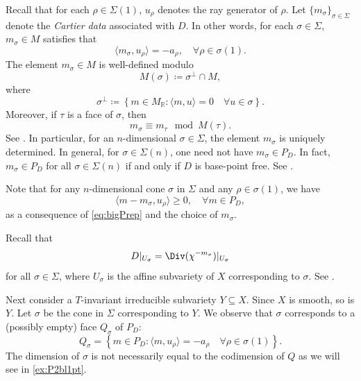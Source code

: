 Recall that for each $\rho\in \Sigma(1)$, $u_{\rho}$ denotes the ray generator of $\rho$.
Let $\{m_{\sigma}\}_{\sigma\in \Sigma}$ denote the \emph{Cartier data} associated with $D$. In other words, for each $\sigma\in \Sigma$, $m_{\sigma}\in M$ satisfies that
\[
\langle m_{\sigma},u_{\rho} \rangle =-a_{\rho},\quad \forall \rho\in \sigma(1).
\]
The element $m_{\sigma}\in M$ is well-defined modulo
\begin{equation}\label{eq:Msigmadef}
    M(\sigma)\coloneqq \sigma^{\perp}\cap M,
\end{equation}
where
\[
\sigma^{\perp}\coloneqq \left\{ m\in M_{\mathbb{R}} : \langle m,u\rangle=0 \quad\forall u\in \sigma \right\}.
\]
Moreover, if $\tau$ is a face of $\sigma$, then
\begin{equation}\label{eq:Cartierdatalowdim}
m_{\sigma}\equiv m_{\tau} \mod M(\tau).
\end{equation}
See \cite[Theorem~4.2.8]{CLS11}. In particular, for an $n$-dimensional $\sigma\in \Sigma$, the element $m_{\sigma}$ is uniquely determined. In general, for $\sigma\in \Sigma(n)$, one need not have $m_{\sigma}\in P_D$. In fact, $m_{\sigma}\in P_D$ for all $\sigma\in \Sigma(n)$ if and only if $D$ is base-point free. See \cite[Theorem~6.1.7]{CLS11}.

Note that for any $n$-dimensional cone $\sigma$ in $\Sigma$ and any $\rho\in \sigma(1)$, we have
\begin{equation}\label{eq:mmsigpos}
    \langle m-m_{\sigma},u_{\rho} \rangle \geq 0,\quad \forall m\in P_D,
\end{equation}
as a consequence of \eqref{eq:bigPrep} and the choice of $m_\sigma$.

Recall that
\begin{equation}\label{eq:DUsigma}
D|_{U_{\sigma}}=\Div(\chi^{-m_{\sigma}})|_{U_{\sigma}}
\end{equation}
for all $\sigma\in \Sigma$, where $U_{\sigma}$ is the affine subvariety of $X$ corresponding to $\sigma$. See \cite[Proposition~4.1.2]{CLS11}.


Next consider a $T$-invariant irreducible subvariety $Y\subseteq X$. Since $X$ is smooth, so is $Y$. Let $\sigma$ be the cone in $\Sigma$ corresponding to $Y$.
We observe that $\sigma$ corresponds to a (possibly empty) face $Q_{\sigma}$ of $P_D$:
\begin{equation}\label{eq:Qsigma}
Q_{\sigma}=\left\{m\in P_D: \langle m,u_{\rho}\rangle=-a_{\rho}\quad \forall \rho\in \sigma(1) \right\}.
\end{equation}
The dimension of $\sigma$ is not necessarily equal to the codimension of $Q$ as we will see in \cref{ex:P2bl1pt}.


